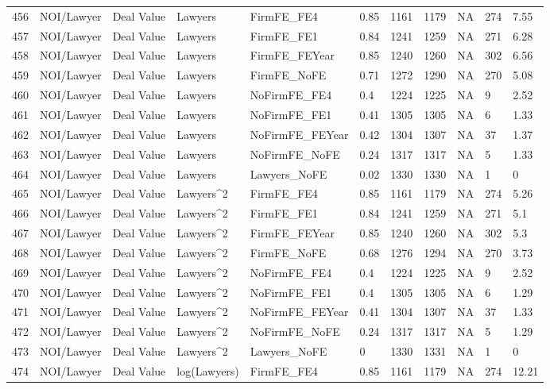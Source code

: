 \documentclass{article}
\begin{document}
\begin{table}[H]
\begin{tabular}{rllllllllll}
  456 & NOI/Lawyer & Deal Value & Lawyers & FirmFE\_FE4 & 0.85 & 1161 & 1179 & NA & 274 & 7.55 \\
  457 & NOI/Lawyer & Deal Value & Lawyers & FirmFE\_FE1 & 0.84 & 1241 & 1259 & NA & 271 & 6.28 \\
  458 & NOI/Lawyer & Deal Value & Lawyers & FirmFE\_FEYear & 0.85 & 1240 & 1260 & NA & 302 & 6.56 \\
  459 & NOI/Lawyer & Deal Value & Lawyers & FirmFE\_NoFE & 0.71 & 1272 & 1290 & NA & 270 & 5.08 \\
  460 & NOI/Lawyer & Deal Value & Lawyers & NoFirmFE\_FE4 & 0.4 & 1224 & 1225 & NA & 9 & 2.52 \\
  461 & NOI/Lawyer & Deal Value & Lawyers & NoFirmFE\_FE1 & 0.41 & 1305 & 1305 & NA & 6 & 1.33 \\
  462 & NOI/Lawyer & Deal Value & Lawyers & NoFirmFE\_FEYear & 0.42 & 1304 & 1307 & NA & 37 & 1.37 \\
  463 & NOI/Lawyer & Deal Value & Lawyers & NoFirmFE\_NoFE & 0.24 & 1317 & 1317 & NA & 5 & 1.33 \\
  464 & NOI/Lawyer & Deal Value & Lawyers & Lawyers\_NoFE & 0.02 & 1330 & 1330 & NA & 1 & 0 \\
  465 & NOI/Lawyer & Deal Value & Lawyers^2 & FirmFE\_FE4 & 0.85 & 1161 & 1179 & NA & 274 & 5.26 \\
  466 & NOI/Lawyer & Deal Value & Lawyers^2 & FirmFE\_FE1 & 0.84 & 1241 & 1259 & NA & 271 & 5.1 \\
  467 & NOI/Lawyer & Deal Value & Lawyers^2 & FirmFE\_FEYear & 0.85 & 1240 & 1260 & NA & 302 & 5.3 \\
  468 & NOI/Lawyer & Deal Value & Lawyers^2 & FirmFE\_NoFE & 0.68 & 1276 & 1294 & NA & 270 & 3.73 \\
  469 & NOI/Lawyer & Deal Value & Lawyers^2 & NoFirmFE\_FE4 & 0.4 & 1224 & 1225 & NA & 9 & 2.52 \\
  470 & NOI/Lawyer & Deal Value & Lawyers^2 & NoFirmFE\_FE1 & 0.4 & 1305 & 1305 & NA & 6 & 1.29 \\
  471 & NOI/Lawyer & Deal Value & Lawyers^2 & NoFirmFE\_FEYear & 0.41 & 1304 & 1307 & NA & 37 & 1.33 \\
  472 & NOI/Lawyer & Deal Value & Lawyers^2 & NoFirmFE\_NoFE & 0.24 & 1317 & 1317 & NA & 5 & 1.29 \\
  473 & NOI/Lawyer & Deal Value & Lawyers^2 & Lawyers\_NoFE & 0 & 1330 & 1331 & NA & 1 & 0 \\
  474 & NOI/Lawyer & Deal Value & log(Lawyers) & FirmFE\_FE4 & 0.85 & 1161 & 1179 & NA & 274 & 12.21 \\

\end{tabular}
\end{table}
\end{document}
